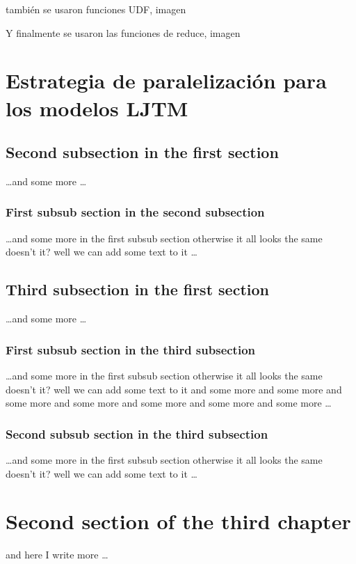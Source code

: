 también se usaron funciones UDF, imagen

Y finalmente se usaron las funciones de reduce, imagen






\section{Estrategia de paralelización para los modelos LJTM} %
\label{section3.3}




\subsection{Second subsection in the first section}
\dots and some more \dots

\subsubsection{First subsub section in the second subsection}
\dots and some more in the first subsub section otherwise it all looks the same
doesn't it? well we can add some text to it \dots

\subsection{Third subsection in the first section}
\dots and some more \dots

\subsubsection{First subsub section in the third subsection}
\dots and some more in the first subsub section otherwise it all looks the same
doesn't it? well we can add some text to it and some more and some more and
some more and some more and some more and some more and some more \dots

\subsubsection{Second subsub section in the third subsection}
\dots and some more in the first subsub section otherwise it all looks the same
doesn't it? well we can add some text to it \dots

\section{Second section of the third chapter}
and here I write more \dots

